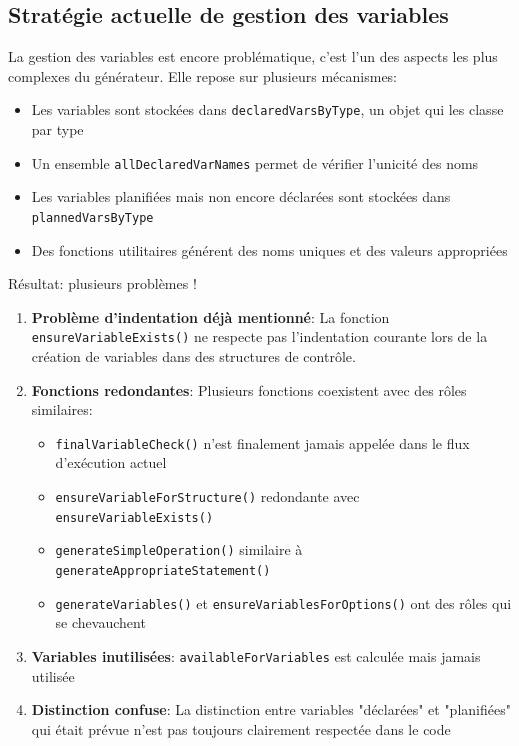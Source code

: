 \documentclass[11pt,a4paper]{article}
\begin{document}
\subsection{Stratégie actuelle de gestion des variables}
La gestion des variables est encore problématique, c'est l'un des aspects les plus complexes du générateur. Elle repose sur plusieurs mécanismes:

\begin{itemize}
    \item Les variables sont stockées dans \texttt{declaredVarsByType}, un objet qui les classe par type
    \item Un ensemble \texttt{allDeclaredVarNames} permet de vérifier l'unicité des noms
    \item Les variables planifiées mais non encore déclarées sont stockées dans \texttt{plannedVarsByType}
    \item Des fonctions utilitaires générent des noms uniques et des valeurs appropriées
\end{itemize}

Résultat: plusieurs problèmes !
\begin{enumerate}
    \item \textbf{Problème d'indentation déjà mentionné}: La fonction \texttt{ensureVariableExists()} ne respecte pas l'indentation courante lors de la création de variables dans des structures de contrôle.
    
    \item \textbf{Fonctions redondantes}: Plusieurs fonctions coexistent avec des rôles similaires:
    \begin{itemize}
        \item \texttt{finalVariableCheck()} n'est finalement jamais appelée dans le flux d'exécution actuel
        \item \texttt{ensureVariableForStructure()} redondante avec \texttt{ensureVariableExists()}
        \item \texttt{generateSimpleOperation()} similaire à \texttt{generateAppropriateStatement()}
        \item \texttt{generateVariables()} et \texttt{ensureVariablesForOptions()} ont des rôles qui se chevauchent
    \end{itemize}
    
    \item \textbf{Variables inutilisées}: \texttt{availableForVariables} est calculée mais jamais utilisée
    
    \item \textbf{Distinction confuse}: La distinction entre variables "déclarées" et "planifiées" qui était prévue n'est pas toujours clairement respectée dans le code
\end{enumerate}
\end{document}
